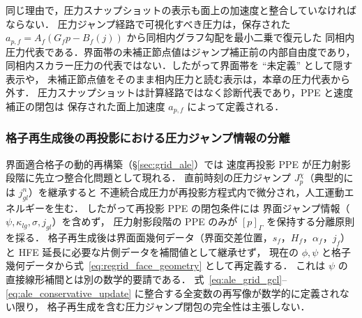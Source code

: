同じ理由で，圧力スナップショットの表示も面上の加速度と整合していなければならない．
圧力ジャンプ経路で可視化すべき圧力は，保存された
$a_{p,f}=A_f(G_fp-B_f(j))$ から同相内グラフ勾配を最小二乗で復元した
同相内圧力代表である．界面帯の未補正節点値はジャンプ補正前の内部自由度であり，
同相内スカラー圧力の代表ではない．したがって界面帯を ``未定義'' として隠す表示や，
未補正節点値をそのまま相内圧力と読む表示は，本章の圧力代表から外す．
圧力スナップショットは計算経路ではなく診断代表であり，PPE と速度補正の閉包は
保存された面上加速度 $a_{p,f}$ によって定義される．

\subsubsection{格子再生成後の再投影における圧力ジャンプ情報の分離}
\label{sec:split_ppe_regrid_guard}

界面適合格子の動的再構築（\S\ref{sec:grid_ale}）では
速度再投影 PPE が圧力射影段階に先立つ整合化問題として現れる．
直前時刻の圧力ジャンプ $J_p^\chi$（典型的には $j_{gl}^n$）を継承すると
不連続合成圧力が再投影方程式内で微分され，人工運動エネルギーを生む．
したがって再投影 PPE の閉包条件には
界面ジャンプ情報（$\psi,\kappa_{lg},\sigma,j_{gl}$）を含めず，
圧力射影段階の PPE のみが $[p]_\Gamma$ を保持する分離原則を採る．
格子再生成後は界面面幾何データ（界面交差位置，$s_f$，$H_f$，$\alpha_f$，$j_f$）と
HFE 延長に必要な片側データを補間値として継承せず，
現在の $\phi,\psi$ と格子幾何データから式~\eqref{eq:regrid_face_geometry} として再定義する．
これは $\psi$ の直接線形補間とは別の数学的要請である．
式~\eqref{eq:ale_grid_gcl}--\eqref{eq:ale_conservative_update} に整合する全変数の再写像が数学的に定義されない限り，
格子再生成を含む圧力ジャンプ閉包の完全性は主張しない．
